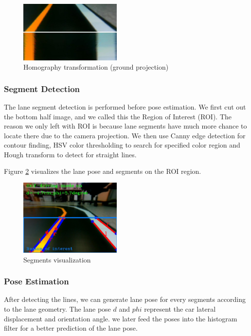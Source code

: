 \documentclass[conference]{IEEEtran}
\begin{document}
\begin{figure}	
	\centering
	\includegraphics[width=2in]{img/extrinsic.png}
	\caption{Homography transformation (ground projection)}
	\label{fig:extrinsic}
\end{figure}

\subsubsection{Segment Detection}

The lane segment detection is performed before pose estimation. We first cut out the bottom half image, and we called this the Region of Interest (ROI). The reason we only left with ROI is because lane segments have much more chance to locate there due to the camera projection. We then use Canny edge detection for contour finding, HSV color thresholding to search for specified color region and Hough transform to detect for straight lines.

Figure \ref{fig:lane_detect} visualizes the lane pose and segments on the ROI region.

\begin{figure}
	\centering
	\includegraphics[width=2in]{img/lane_detect.png}
	\caption{Segments visualization}
	\label{fig:lane_detect}
\end{figure}

\subsubsection{Pose Estimation}

After detecting the lines, we can generate lane pose for every segments according to the lane geometry. The lane pose $d$ and $phi$ represent the car lateral displacement and orientation angle. we later feed the poses into the histogram filter for a better prediction of the lane pose.
\end{document}
